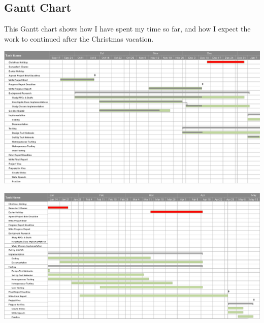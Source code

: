 \documentclass[12pt]{report}
\begin{document}
\pagebreak

\begin{landscape}

\section{Gantt Chart}
This Gantt chart shows how I have spent my time so far, and how I expect the
work to continued after the Christmas vacation.

\begin{center}
\includegraphics[width=\linewidth]{../Gantt/GanttPart1.png}
\end{center}

\begin{center}
\includegraphics[width=\linewidth]{../Gantt/GanttPart2.png}
\end{center}

\end{landscape}

\pagebreak

\printnomenclature

\pagebreak
\end{document}
